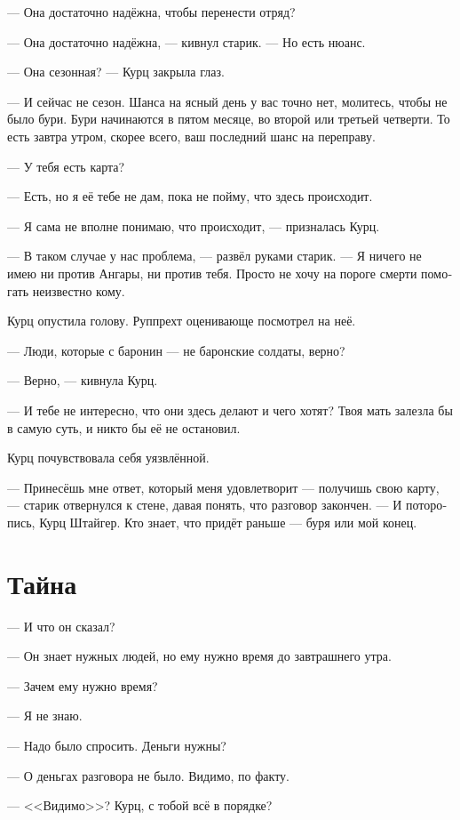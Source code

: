 \documentclass[a4paper,12pt,fleqn]{book}\usepackage{polyglossia}\setdefaultlanguage[babelshorthands=true]{russian}\setotherlanguage{english}\defaultfontfeatures{Ligatures=TeX,Mapping=tex-text}\usepackage{xcolor}\newcommand{\ml}[3]{#2}
\begin{document}
--- Она достаточно надёжна, чтобы перенести отряд?

--- Она достаточно надёжна, --- кивнул старик.
--- Но есть нюанс.

--- Она сезонная? --- Курц закрыла глаз.

--- И сейчас не сезон.
Шанса на ясный день у вас точно нет, молитесь, чтобы не было бури.
Бури начинаются в пятом месяце, во второй или третьей четверти.
То есть завтра утром, скорее всего, ваш последний шанс на переправу.

--- У тебя есть карта?

--- Есть, но я её тебе не дам, пока не пойму, что здесь происходит.

--- Я сама не вполне понимаю, что происходит, --- призналась Курц.

--- В таком случае у нас проблема, --- развёл руками старик.
--- Я ничего не имею ни против Ангары, ни против тебя.
Просто не хочу на пороге смерти помогать неизвестно кому.

Курц опустила голову.
Руппрехт оценивающе посмотрел на неё.

--- Люди, которые с баронин --- не баронские солдаты, верно?

--- Верно, --- кивнула Курц.

--- И тебе не интересно, что они здесь делают и чего хотят?
Твоя мать залезла бы в самую суть, и никто бы её не остановил.

Курц почувствовала себя уязвлённой.

--- Принесёшь мне ответ, который меня удовлетворит --- получишь свою карту, --- старик отвернулся к стене, давая понять, что разговор закончен.
--- И поторопись, Курц Штайгер.
Кто знает, что придёт раньше --- буря или мой конец.

\section{Тайна}

--- И что он сказал?

--- Он знает нужных людей, но ему нужно время до завтрашнего утра.

--- Зачем ему нужно время?

--- Я не знаю.

--- Надо было спросить.
Деньги нужны?

--- О деньгах разговора не было.
Видимо, по факту.

\ml{$0$}
{--- <<Видимо>>?}
{`` `Apparently'?}
\ml{$0$}
{Курц, с тобой всё в порядке?}
{Kurz, are you all right?''}
\end{document}
